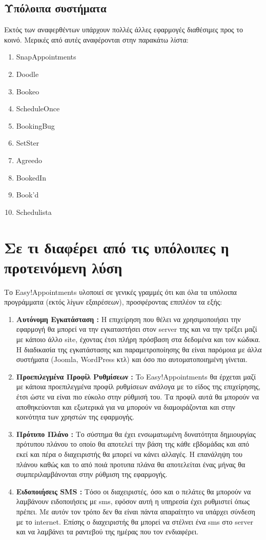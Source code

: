 \documentclass[12pt]{article}
\begin{document}
\subsection{Υπόλοιπα συστήματα}
Εκτός των αναφερθέντων υπάρχουν πολλές άλλες εφαρμογές διαθέσιμες προς το κοινό. Μερικές από αυτές αναφέρονται στην παρακάτω λίστα:
\begin{enumerate}
\item SnapAppointments
\item Doodle
\item Bookeo
\item ScheduleOnce
\item BookingBug
\item SetSter
\item Agreedo
\item BookedIn
\item Book'd
\item Schedulista
\end{enumerate}

\section{Σε τι διαφέρει από τις υπόλοιπες η προτεινόμενη λύση}
Το Easy!Appointments υλοποιεί σε γενικές γραμμές ότι και όλα τα υπόλοιπα προγράμματα (εκτός λίγων εξαιρέσεων), προσφέροντας επιπλέον τα εξής:

\begin{enumerate}
\item {\bf Αυτόνομη Εγκατάσταση :} Η επιχείρηση που θέλει να χρησιμοποιήσει την εφαρμογή θα μπορεί να την εγκαταστήσει στον server της και να την τρέξει μαζί με κάποιο άλλο site, έχοντας έτσι πλήρη πρόσβαση στα δεδομένα και τον κώδικα. Η διαδικασία της εγκατάστασης και παραμετροποίησης θα είναι παρόμοια με άλλα συστήματα (Joomla, WordPress κτλ) και όσο πιο αυτοματοποιημένη γίνεται.

\item {\bf Προεπιλεγμένα Προφίλ Ρυθμίσεων :} To Easy!Appointments θα έρχεται μαζί με κάποια προεπιλεγμένα προφίλ ρυθμίσεων ανάλογα με το είδος της επιχείρησης, έτσι ώστε να είναι πιο εύκολο στην ρύθμισή του. Τα προφίλ αυτά θα μπορούν να αποθηκεύονται και εξωτερικά για να μπορούν να διαμοιράζονται και στην κοινότητα των χρηστών της εφαρμογής.

\item {\bf Πρότυπο Πλάνο :} Το σύστημα θα έχει ενσωματωμένη δυνατότητα δημιουργίας πρότυπου πλάνου το οποίο θα αποτελεί την βάση της κάθε εβδομάδας και από εκεί και πέρα ο διαχειριστής θα μπορεί να κάνει αλλαγές. Η επανάληψη του πλάνου καθώς και το από ποιά προτυπα πλάνα θα αποτελείται ένας μήνας θα συμπεριλαμβάνονται στην ρύθμιση της εφαρμογής.

\item {\bf Ειδοποιήσεις SMS :} Τόσο οι διαχειριστές, όσο και ο πελάτες θα μπορούν να λαμβάνουν  ειδοποιήσεις με sms, εφόσον αυτή η υπηρεσία έχει ρυθμιστεί όπως πρέπει. Με αυτόν τον τρόπο δεν θα είναι πάντα απαραίτητο να υπάρχει σύνδεση με το internet. Επίσης ο διαχειριστής θα μπορεί να στέλνει ένα sms στο server και να λαμβάνει τα ραντεβού της ημέρας που τον ενδιαφέρει.

\end{enumerate}
\end{document}
